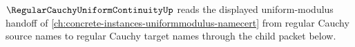 $\RegularCauchyUniformContinuityUp$ reads the displayed uniform-modulus handoff of \autoref{ch:concrete-instances-uniformmodulus-namecert} from regular Cauchy source names to regular Cauchy target names through the child packet below.


